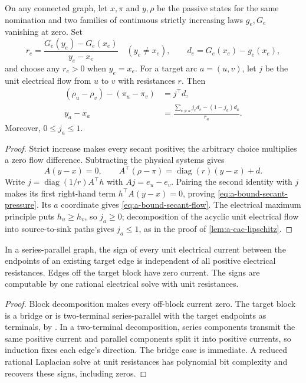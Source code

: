 \begin{lemma}
\label{lem:a-bound-secant}
On any connected graph, let $x,\pi$ and $y,\rho$ be the passive states
for the same nomination and two families of continuous strictly
increasing laws $g_e,G_e$ vanishing at zero. Set
\[
 r_e=\frac{G_e(y_e)-G_e(x_e)}{y_e-x_e}\quad(y_e\ne x_e),
 \qquad d_e=G_e(x_e)-g_e(x_e),
\]
and choose any $r_e>0$ when $y_e=x_e$. For a target arc $a=(u,v)$,
let $j$ be the unit electrical flow from $u$ to $v$ with resistances $r$.
Then
\begin{align}
 (\rho_u-\rho_v)-(\pi_u-\pi_v)&=j^\top d,\label{eq:a-bound-secant-pressure}\\
 y_a-x_a&=\frac{\sum_{e\ne a}j_ed_e-(1-j_a)d_a}{r_a}.
 \label{eq:a-bound-secant-flow}
\end{align}
Moreover, $0\le j_a\le1$.
\end{lemma}
\begin{proof}
Strict increase makes every secant positive; the arbitrary choice
multiplies a zero flow difference. Subtracting the physical systems gives
\[
 A(y-x)=0,\qquad A^\top(\rho-\pi)=\operatorname{diag}(r)(y-x)+d.
\]
Write $j=\operatorname{diag}(1/r)A^\top h$ with
$Aj=e_u-e_v$. Pairing the second identity with $j$ makes its first
right-hand term $h^\top A(y-x)=0$, proving
\cref{eq:a-bound-secant-pressure}. Its $a$ coordinate gives
\cref{eq:a-bound-secant-flow}. The electrical maximum principle puts
$h_u\ge h_v$, so $j_a\ge0$; decomposition of the acyclic unit electrical
flow into source-to-sink paths gives $j_a\le1$, as in the proof of
\cref{lem:a-cac-lipschitz}.
\end{proof}

\begin{lemma}
\label{lem:a-bound-signs}
In a series-parallel graph, the sign of every unit electrical current
between the endpoints of an existing target edge is independent of all
positive electrical resistances. Edges off the target block have zero
current. The signs are computable by one rational electrical solve
with unit resistances.
\end{lemma}
\begin{proof}
Block decomposition makes every off-block current zero. The target
block is a bridge or is two-terminal series-parallel with the target
endpoints as terminals, by
\citet[Lemma 9]{eppstein1992-parallel-recognition-of-series-parallel}.
In a two-terminal decomposition, series components transmit the same
positive current and parallel components split it into positive
currents, so induction fixes each edge's direction. The bridge case is
immediate. A reduced rational Laplacian solve at unit resistances has
polynomial bit complexity and recovers these signs, including zeros.
\end{proof}

